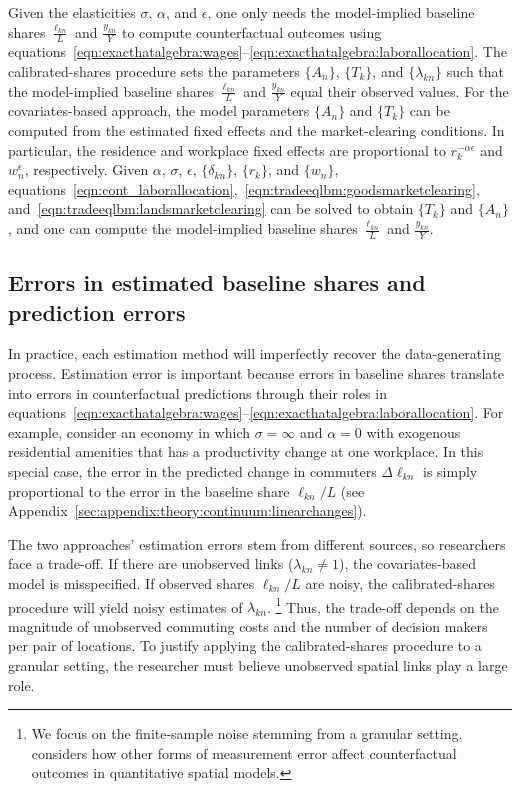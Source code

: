 \documentclass[11pt]{article}
\theoremstyle{definition}
\begin{document}
Given the elasticities $\sigma$, $\alpha$, and $\epsilon$,
one only needs the model-implied baseline shares $\frac{\ell_{kn}}{L}$ and $\frac{y_{kn}}{Y}$
to compute counterfactual outcomes using
equations~\eqref{eqn:exacthatalgebra:wages}--\eqref{eqn:exacthatalgebra:laborallocation}.
The calibrated-shares procedure sets the parameters $\{A_n\}$, $\{T_k\}$, and $\{\lambda_{kn}\}$
such that the model-implied baseline shares $\frac{\ell_{kn}}{L}$ and $\frac{y_{kn}}{Y}$ equal their observed values.
For the covariates-based approach,
the model parameters $\{{A}_{n}\}$ and $\{{T}_{k}\}$ can be computed from the estimated fixed effects and the market-clearing conditions.
In particular,
the residence and workplace fixed effects are proportional to ${r}_{k}^{-\alpha\epsilon}$ and ${w}_{n}^{\epsilon}$, respectively.
Given $\alpha$, $\sigma$, $\epsilon$, $\{\delta_{kn}\}$, $\{{r}_{k}\}$, and $\{{w}_{n}\}$,
equations~\eqref{eqn:cont_laborallocation},~\eqref{eqn:tradeeqlbm:goodsmarketclearing}, and~\eqref{eqn:tradeeqlbm:landsmarketclearing}
can be solved to obtain $\{{T}_{k}\}$ and $\{{A}_{n}\}$,
and one can compute 
the model-implied baseline shares $\frac{\ell_{kn}}{L}$ and $\frac{y_{kn}}{Y}$.

\subsection{Errors in estimated baseline shares and prediction errors}\label{sec:ctflgranular:errorsinshares}

In practice, each estimation method will imperfectly recover the data-generating process.
Estimation error is important because
errors in baseline shares translate into errors in counterfactual predictions
through their roles in equations~\eqref{eqn:exacthatalgebra:wages}--\eqref{eqn:exacthatalgebra:laborallocation}.
For example, consider an economy in which $\sigma = \infty$ and $\alpha = 0$ with exogenous residential amenities
that has a productivity change at one workplace.
In this special case,
the error in the predicted change in commuters $\Delta \ell_{kn}$ is simply proportional to the error in the baseline share $\ell_{kn}/L$
(see Appendix~\ref{sec:appendix:theory:continuum:linearchanges}).

The two approaches' estimation errors stem from different sources,
so researchers face a trade-off.
If there are unobserved links ($\lambda_{kn} \neq 1$), the covariates-based model is misspecified.
If observed shares $\ell_{kn}/L$ are noisy, the calibrated-shares procedure will yield noisy estimates of $\lambda_{kn}$.%
\footnote{We focus on the finite-sample noise stemming from a granular setting.
\cite{Sanders:2024} considers how other forms of measurement error affect counterfactual outcomes in quantitative spatial models.}
Thus, the trade-off depends on the magnitude of unobserved commuting costs and the number of decision makers per pair of locations.
To justify applying the calibrated-shares procedure to a granular setting,
the researcher must believe unobserved spatial links play a large role.
\end{document}
